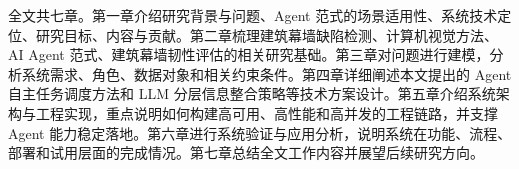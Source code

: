 全文共七章。第一章介绍研究背景与问题、Agent 范式的场景适用性、系统技术定位、研究目标、内容与贡献。第二章梳理建筑幕墙缺陷检测、计算机视觉方法、AI Agent 范式、建筑幕墙韧性评估的相关研究基础。第三章对问题进行建模，分析系统需求、角色、数据对象和相关约束条件。第四章详细阐述本文提出的 Agent 自主任务调度方法和 LLM 分层信息整合策略等技术方案设计。第五章介绍系统架构与工程实现，重点说明如何构建高可用、高性能和高并发的工程链路，并支撑 Agent 能力稳定落地。第六章进行系统验证与应用分析，说明系统在功能、流程、部署和试用层面的完成情况。第七章总结全文工作内容并展望后续研究方向。
